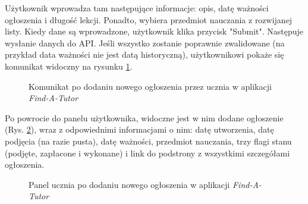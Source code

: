 \documentclass[12pt]{article}
\numberwithin{figure}{section}
\begin{document}
\begin{sloppypar}
Użytkownik wprowadza tam następujące informacje: opis, datę ważności ogłoszenia i długość lekcji. Ponadto, wybiera przedmiot nauczania z rozwijanej listy. Kiedy dane są wprowadzone, użytkownik klika przycisk "Submit". Następuje wysłanie danych do API. Jeśli wszystko zostanie poprawnie zwalidowane (na przykład data ważności nie jest datą historyczną), użytkownikowi pokaże się komunikat widoczny na rysunku \ref{fig:added}.
\begin{figure}[!htbp] 
    \captionsetup{justification=centering}
    \centering
    \caption{Komunikat po dodaniu nowego ogłoszenia przez ucznia w aplikacji \textit{Find-A-Tutor}}
    \label{fig:added}
\end{figure}

Po powrocie do panelu użytkownika, widoczne jest w nim dodane ogłoszenie (Rys. \ref{fig:student}), wraz z odpowiednimi informacjami o nim: datę utworzenia, datę podjęcia (na razie pusta), datę ważności, przedmiot nauczania, trzy flagi stanu (podjęte, zapłacone i wykonane) i link do podstrony z wszystkimi szczegółami ogłoszenia.
\begin{figure}[!htbp] 
    \captionsetup{justification=centering}
    \centering
    \caption{Panel ucznia po dodaniu nowego ogłoszenia w aplikacji \textit{Find-A-Tutor}}
    \label{fig:student}
\end{figure}


\end{sloppypar}
\end{document}
